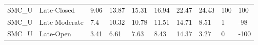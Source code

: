 \begin{sidewaystable}[!htbp]
\begin{tabular}{@{}llllllllll@{}}
\small SMC\_U                   & Late-Closed              & 9.06            & 13.87            & 15.31            & 16.94            & 22.47             & 24.\small 43                                                              & 100                                                              & \small 100                                                                \\
\small SMC\_U                   & Late-Moderate            & 7.4             & 10.32            & 10.78            & 11.51            & 14.71             & 8.\small 51                                                               & 1                                                                & -\small 98                                                                \\
\small SMC\_U                   & Late-Open                & 3.41            & 6.61             & 7.63             & 8.43             & 14.37             & 3.\small 27                                                               & 0                                                                & -\small 100                                                               \\ \bottomrule
\end{tabular}
\end{sidewaystable}



